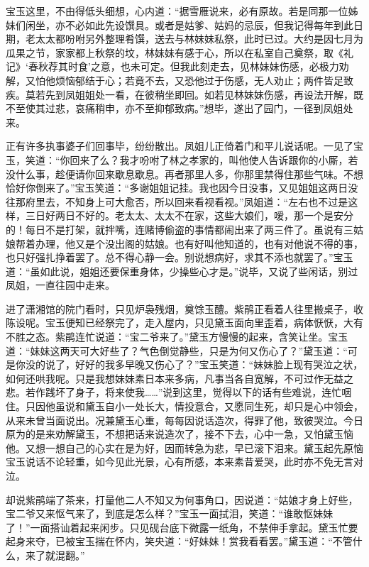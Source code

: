宝玉这里，不由得低头细想，心内道：“据雪雁说来，必有原故。若是同那一位姊妹们闲坐，亦不必如此先设馔具。或者是姑爹、姑妈的忌辰，但我记得每年到此日期，老太太都吩咐另外整理肴馔，送去与林妹妹私祭，此时已过。大约是因七月为瓜果之节，家家都上秋祭的坟，林妹妹有感于心，所以在私室自己奠祭，取《礼记》‘春秋荐其时食’之意，也未可定。但我此刻走去，见林妹妹伤感，必极力劝解，又怕他烦恼郁结于心；若竟不去，又恐他过于伤感，无人劝止；两件皆足致疾。莫若先到凤姐姐处一看，在彼稍坐即回。如若见林妹妹伤感，再设法开解，既不至使其过悲，哀痛稍申，亦不至抑郁致病。”想毕，遂出了园门，一径到凤姐处来。

正有许多执事婆子们回事毕，纷纷散出。凤姐儿正倚着门和平儿说话呢。一见了宝玉，笑道：“你回来了么？我才吩咐了林之孝家的，叫他使人告诉跟你的小厮，若没什么事，趁便请你回来歇息歇息。再者那里人多，你那里禁得住那些气味。不想恰好你倒来了。”宝玉笑道：“多谢姐姐记挂。我也因今日没事，又见姐姐这两日没往那府里去，不知身上可大愈否，所以回来看视看视。”凤姐道：“左右也不过是这样，三日好两日不好的。老太太、太太不在家，这些大娘们，嗳，那一个是安分的！每日不是打架，就拌嘴，连赌博偷盗的事情都闹出来了两三件了。虽说有三姑娘帮着办理，他又是个没出阁的姑娘。也有好叫他知道的，也有对他说不得的事，也只好强扎挣着罢了。总不得心静一会。别说想病好，求其不添也就罢了。”宝玉道：“虽如此说，姐姐还要保重身体，少操些心才是。”说毕，又说了些闲话，别过凤姐，一直往园中走来。

进了潇湘馆的院门看时，只见炉袅残烟，奠馀玉醴。紫鹃正看着人往里搬桌子，收陈设呢。宝玉便知已经祭完了，走入屋内，只见黛玉面向里歪着，病体恹恹，大有不胜之态。紫鹃连忙说道：“宝二爷来了。”黛玉方慢慢的起来，含笑让坐。宝玉道：“妹妹这两天可大好些了？气色倒觉静些，只是为何又伤心了？”黛玉道：“可是你没的说了，好好的我多早晚又伤心了？”宝玉笑道：“妹妹脸上现有哭泣之状，如何还哄我呢。只是我想妹妹素日本来多病，凡事当各自宽解，不可过作无益之悲。若作践坏了身子，将来使我\ldots{}\ldots{}”说到这里，觉得以下的话有些难说，连忙咽住。只因他虽说和黛玉自小一处长大，情投意合，又愿同生死，却只是心中领会，从来未曾当面说出。况兼黛玉心重，每每因说话造次，得罪了他，致彼哭泣。今日原为的是来劝解黛玉，不想把话来说造次了，接不下去，心中一急，又怕黛玉恼他。又想一想自己的心实在是为好，因而转急为悲，早已滚下泪来。黛玉起先原恼宝玉说话不论轻重，如今见此光景，心有所感，本来素昔爱哭，此时亦不免无言对泣。

却说紫鹃端了茶来，打量他二人不知又为何事角口，因说道：“姑娘才身上好些，宝二爷又来怄气来了，到底是怎么样？”宝玉一面拭泪，笑道：“谁敢怄妹妹了！”一面搭讪着起来闲步。只见砚台底下微露一纸角，不禁伸手拿起。黛玉忙要起身来夺，已被宝玉揣在怀内，笑央道：“好妹妹！赏我看看罢。”黛玉道：“不管什么，来了就混翻。”

